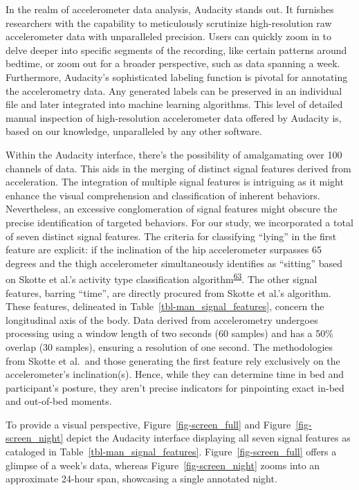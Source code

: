 \documentclass[
  10pt,
]{scrbook}
\begin{document}
In the realm of accelerometer data analysis, Audacity stands out. It
furnishes researchers with the capability to meticulously scrutinize
high-resolution raw accelerometer data with unparalleled precision.
Users can quickly zoom in to delve deeper into specific segments of the
recording, like certain patterns around bedtime, or zoom out for a
broader perspective, such as data spanning a week. Furthermore,
Audacity's sophisticated labeling function is pivotal for annotating the
accelerometry data. Any generated labels can be preserved in an
individual file and later integrated into machine learning algorithms.
This level of detailed manual inspection of high-resolution
accelerometer data offered by Audacity is, based on our knowledge,
unparalleled by any other software.

Within the Audacity interface, there's the possibility of amalgamating
over 100 channels of data. This aids in the merging of distinct signal
features derived from acceleration. The integration of multiple signal
features is intriguing as it might enhance the visual comprehension and
classification of inherent behaviors. Nevertheless, an excessive
conglomeration of signal features might obscure the precise
identification of targeted behaviors. For our study, we incorporated a
total of seven distinct signal features. The criteria for classifying
``lying'' in the first feature are explicit: if the inclination of the
hip accelerometer surpasses 65 degrees and the thigh accelerometer
simultaneously identifies as ``sitting'' based on Skotte et al.'s
activity type classification
algorithm\textsuperscript{\protect\hyperlink{ref-skotte_detection_2014}{63}}.
The other signal features, barring ``time'', are directly procured from
Skotte et al.'s algorithm. These features, delineated in
Table~\ref{tbl-man_signal_features}, concern the longitudinal axis of
the body. Data derived from accelerometry undergoes processing using a
window length of two seconds (60 samples) and has a 50\% overlap (30
samples), ensuring a resolution of one second. The methodologies from
Skotte et al.~and those generating the first feature rely exclusively on
the accelerometer's inclination(s). Hence, while they can determine time
in bed and participant's posture, they aren't precise indicators for
pinpointing exact in-bed and out-of-bed moments.

To provide a visual perspective, Figure~\ref{fig-screen_full} and
Figure~\ref{fig-screen_night} depict the Audacity interface displaying
all seven signal features as cataloged in
Table~\ref{tbl-man_signal_features}. Figure~\ref{fig-screen_full} offers
a glimpse of a week's data, whereas Figure~\ref{fig-screen_night} zooms
into an approximate 24-hour span, showcasing a single annotated night.
\end{document}
